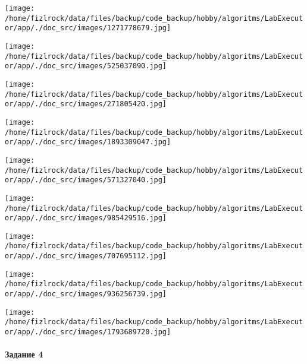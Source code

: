 \documentclass[a4paper, 12pt]{article}
\begin{document}
\texttt{[image: /home/fizlrock/data/files/backup/code\_backup/hobby/algoritms/LabExecutor/app/./doc\_src/images/1271778679.jpg]}

\texttt{[image: /home/fizlrock/data/files/backup/code\_backup/hobby/algoritms/LabExecutor/app/./doc\_src/images/525037090.jpg]}

\texttt{[image: /home/fizlrock/data/files/backup/code\_backup/hobby/algoritms/LabExecutor/app/./doc\_src/images/271805420.jpg]}

\texttt{[image: /home/fizlrock/data/files/backup/code\_backup/hobby/algoritms/LabExecutor/app/./doc\_src/images/1893309047.jpg]}

\texttt{[image: /home/fizlrock/data/files/backup/code\_backup/hobby/algoritms/LabExecutor/app/./doc\_src/images/571327040.jpg]}

\texttt{[image: /home/fizlrock/data/files/backup/code\_backup/hobby/algoritms/LabExecutor/app/./doc\_src/images/985429516.jpg]}

\texttt{[image: /home/fizlrock/data/files/backup/code\_backup/hobby/algoritms/LabExecutor/app/./doc\_src/images/707695112.jpg]}

\texttt{[image: /home/fizlrock/data/files/backup/code\_backup/hobby/algoritms/LabExecutor/app/./doc\_src/images/936256739.jpg]}

\texttt{[image: /home/fizlrock/data/files/backup/code\_backup/hobby/algoritms/LabExecutor/app/./doc\_src/images/1793689720.jpg]}
\pagebreak
\paragraph{Задание 4}
\end{document}
